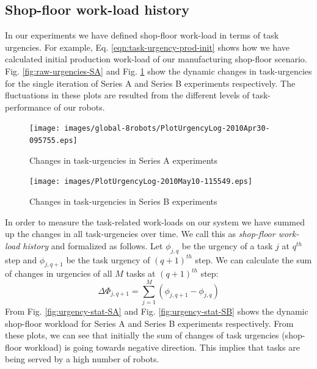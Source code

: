 \documentclass[preprint,12pt]{elsarticle}
\begin{document}
\subsection*{Shop-floor work-load history}
In our experiments we have defined shop-floor work-load in terms of task urgencies. For example, Eq. \ref{eqn:task-urgency-prod-init} shows how we have calculated initial production work-load of our manufacturing shop-floor scenario. Fig. \ref{fig:raw-urgencies-SA} and Fig. \ref{fig:raw-urgencies-SB}  show the dynamic changes in task-urgencies for the single iteration of Series A and Series B experiments respectively. The fluctuations in these plots are resulted from the different levels of task-performance of our robots.
\begin{figure}
\centering
\texttt{[image: images/global-8robots/PlotUrgencyLog-2010Apr30-095755.eps]}
\caption{\small Changes in task-urgencies in Series A experiments}
\label{fig:raw-urgencies-SA} 
\centering
\texttt{[image: images/PlotUrgencyLog-2010May10-115549.eps]}
\caption{\small Changes in task-urgencies in Series B experiments} 
\label{fig:raw-urgencies-SB} 
\end{figure}
In order to measure the task-related work-loads on our system we have summed up the changes in all task-urgencies over time. We call this as {\em shop-floor work-load history} and formalized as follows. Let $ \phi_{j, q}$ be the urgency of a task $j$ at $q^{th}$ step and $\phi_{j, q+1}$ be the task urgency of $(q+1)^{th}$ step. We can calculate the sum of changes in urgencies of all $M$ tasks at $(q+1)^{th}$ step:
\begin{equation} 
\Delta \Phi_{j, q+1} = \sum_{j=1}^{M} (\phi_{j, q+1} - \phi_{j, q})
\label{eqn:Delta-Phi}
\end{equation}
From Fig. \ref{fig:urgency-stat-SA} and Fig. \ref{fig:urgency-stat-SB} shows the dynamic shop-floor workload for Series A and Series B experiments respectively. From these plots, we can see that initially the sum of changes of task urgencies (shop-floor workload) is going towards negative direction. This implies that tasks are being served by a high number of robots. 
\end{document}
